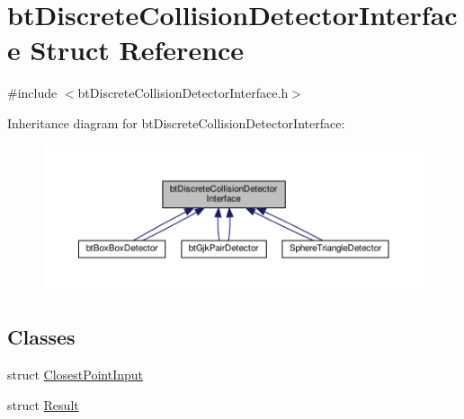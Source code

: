 \hypertarget{structbtDiscreteCollisionDetectorInterface}{}\section{bt\+Discrete\+Collision\+Detector\+Interface Struct Reference}
\label{structbtDiscreteCollisionDetectorInterface}


{\ttfamily \#include $<$bt\+Discrete\+Collision\+Detector\+Interface.\+h$>$}



Inheritance diagram for bt\+Discrete\+Collision\+Detector\+Interface\+:
\nopagebreak
\begin{figure}[H]
\begin{center}
\leavevmode
\includegraphics[width=350pt]{structbtDiscreteCollisionDetectorInterface__inherit__graph}
\end{center}
\end{figure}
\subsection*{Classes}
\begin{DoxyCompactItemize}
\item 
struct \hyperlink{structbtDiscreteCollisionDetectorInterface_1_1ClosestPointInput}{Closest\+Point\+Input}
\item 
struct \hyperlink{structbtDiscreteCollisionDetectorInterface_1_1Result}{Result}
\end{DoxyCompactItemize}
